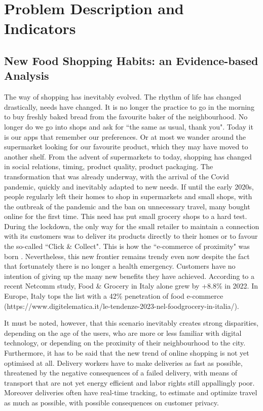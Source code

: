 \section{Problem Description and Indicators}
\subsection{New Food Shopping Habits: an Evidence-based Analysis}

The way of shopping has inevitably evolved. The rhythm of life has changed drastically, needs have changed. It is no longer the practice to go in the morning to buy freshly baked bread from the favourite baker of the neighbourhood. No longer do we go into shops and ask for ``the same as usual, thank you". Today it is our apps that remember our preferences. Or at most we wander around the supermarket looking for our favourite product, which they may have moved to another shelf. From the advent of supermarkets to today, shopping has changed in social relations, timing, product quality, product packaging. The transformation that was already underway, with the arrival of the Covid pandemic, quickly and inevitably adapted to new needs. If until the early 2020s, people regularly left their homes to shop in supermarkets and small shops, with the outbreak of the pandemic and the ban on unnecessary travel, many bought online for the first time. This need has put small grocery shops to a hard test. During the lockdown, the only way for the small retailer to maintain a connection with its customers was to deliver its products directly to their homes or to favour the so-called ``Click \& Collect". This is how the ``e-commerce of proximity" was born \cite{prox_ecom}. Nevertheless, this new frontier remains trendy even now despite the fact that fortunately there is no longer a health emergency. Customers have no intention of giving up the many new benefits they have achieved. According to a recent Netcomm study, Food \& Grocery in Italy alone grew by +8.8\% in 2022. In Europe, Italy tops the list with a 42\% penetration of food e-commerce (https://www.digitelematica.it/le-tendenze-2023-nel-foodgrocery-in-italia/). 

It must be noted, however, that this scenario inevitably creates strong disparities, depending on the age of the users, who are more or less familiar with digital technology, or depending on the proximity of their neighbourhood to the city.
Furthermore, it has to be said that the new trend of online shopping is not yet optimised at all. Delivery workers have to make deliveries as fast as possible, threatened by the negative consequences of a failed delivery, with means of transport that are not yet energy efficient and labor rights still appallingly poor. Moreover deliveries often have real-time tracking, to estimate and optimize travel as much as possible, with possible consequences on customer privacy.

